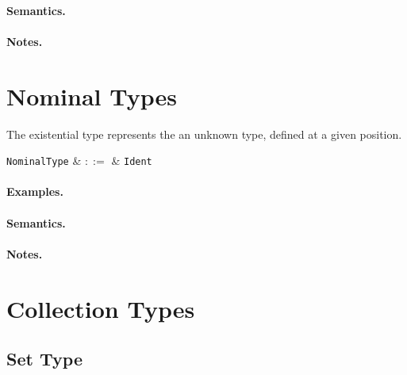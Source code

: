 \paragraph{Semantics.}

\paragraph{Notes.}


\section{Nominal Types}

The existential type represents the an unknown type, defined at a given position.

\begin{syntax}
  \verb+NominalType+ & $::=$ & \verb+Ident+\\
\end{syntax}

\paragraph{Examples.}

\paragraph{Semantics.}

\paragraph{Notes.}


\section{Collection Types}


\subsection{Set Type}


